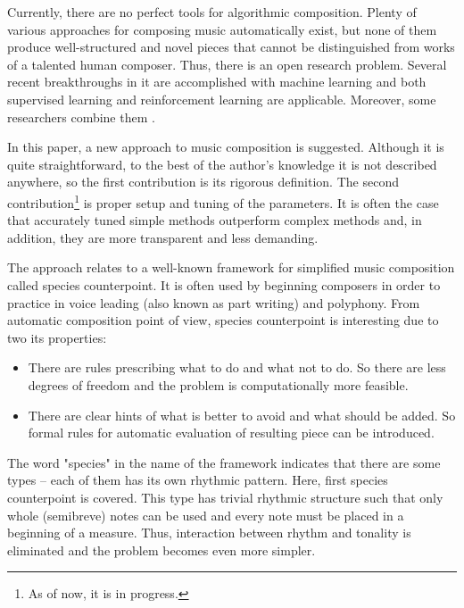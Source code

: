 \documentclass{article}
\begin{document}
Currently, there are no perfect tools for algorithmic composition. Plenty of various approaches for composing music automatically exist, but none of them produce well-structured and novel pieces that cannot be distinguished from works of a talented human composer. Thus, there is an open research problem. Several recent breakthroughs in it are accomplished with machine learning and both supervised learning \cite{johnson2017generating, payne2019musenet} and reinforcement learning \cite{smith2012reinforcement} are applicable. Moreover, some researchers combine them \cite{jaques2016generating, kotecha2018bach, kumar2019polyphonic}.

In this paper, a new approach to music composition is suggested. Although it is quite straightforward, to the best of the author's knowledge it is not described anywhere, so the first contribution is its rigorous definition. The second contribution\footnote{As of now, it is in progress.} is proper setup and tuning of the parameters. It is often the case that accurately tuned simple methods outperform complex methods \cite{dacrema2019are} and, in addition, they are more transparent and less demanding.

The approach relates to a well-known framework for simplified music composition called species counterpoint. It is often used by beginning composers in order to practice in voice leading (also known as part writing) and polyphony. From automatic composition point of view, species counterpoint is interesting due to two its properties:
\begin{itemize}
	\item There are rules prescribing what to do and what not to do. So there are less degrees of freedom and the problem is computationally more feasible.
	\item There are clear hints of what is better to avoid and what should be added. So formal rules for automatic evaluation of resulting piece can be introduced.
\end{itemize}

The word "species" in the name of the framework indicates that there are some types -- each of them has its own rhythmic pattern. Here, first species counterpoint is covered. This type has trivial rhythmic structure such that only whole (semibreve) notes can be used and every note must be placed in a beginning of a measure. Thus, interaction between rhythm and tonality is eliminated and the problem becomes even more simpler. 
\end{document}
